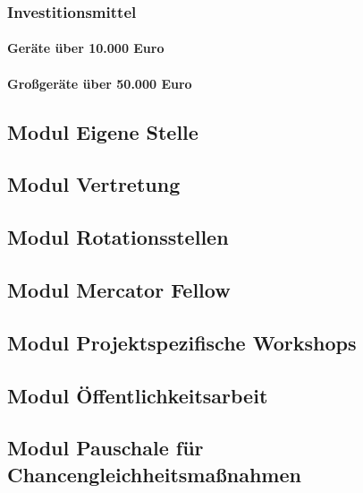 \documentclass[de]{dfg-proposal}
\begin{document}
\subsubsection{Investitionsmittel}

\paragraph{Geräte über 10.000 Euro}

\paragraph{Großgeräte über 50.000 Euro}

\subsection{Modul Eigene Stelle}

\subsection{Modul Vertretung}

\subsection{Modul Rotationsstellen}

\subsection{Modul Mercator Fellow}

\subsection{Modul Projektspezifische Workshops}

\subsection{Modul Öffentlichkeitsarbeit}

\subsection{Modul Pauschale für Chancengleichheitsmaßnahmen}
\end{document}
